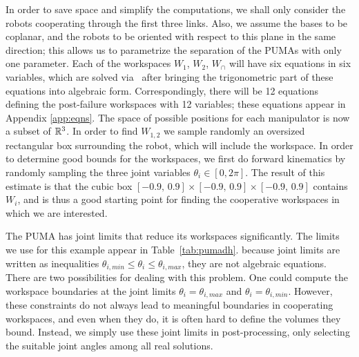 \documentclass[12pt]{report}
\begin{document}
In order to save space and simplify the computations, we shall only consider the robots cooperating through the first three links.  Also, we assume the bases to be coplanar, and the robots to be oriented with respect to this plane in the same direction; this allows us to parametrize the separation of the PUMAs with only one parameter.  Each of the workspaces $W_1$, $W_2$, $W_\cap$ will have six equations in six variables, which are solved via \bertini \, after bringing the trigonometric part of these equations into algebraic form.  Correspondingly,  there will be  12 equations defining the  post-failure workspaces with 12  variables; these equations appear in Appendix \ref{app:eqns}.  
The space of possible positions for each manipulator is now a subset of $\mathbb{R}^3$. In order to find $W_{1,2}$ we sample randomly an oversized rectangular box surrounding the robot, which will include the workspace. In order to determine good bounds for the workspaces, we first do forward kinematics by randomly sampling the three joint variables $\theta_i \in [0,2 \pi]$. The result of this estimate is that the cubic box  $[ -0.9,\, 0.9 ] \times [ -0.9,\, 0.9 ] \times [ -0.9,\, 0.9]$ contains $W_i$, and is thus a good starting point for finding the cooperative workspaces in which we are interested. 



The PUMA has joint limits that reduce its workspaces significantly. The limits we use for this example appear in Table~\ref{tab:pumadh}.  because joint limits are written as inequalities $\theta_{i,min} \leq \theta_i \leq \theta_{i,max}$, they are not algebraic equations.     There are two possibilities for dealing with this problem. One could compute the workspace boundaries at the joint limits $\theta_i=\theta_{i,max}$ and $\theta_i=\theta_{i,min}$. However, these constraints do not always lead to meaningful boundaries in cooperating workspaces, and even when they do, it is often hard to define the volumes they bound. Instead, we simply use these joint limits in post-processing, only selecting the suitable  joint angles among all real solutions.  
\end{document}
